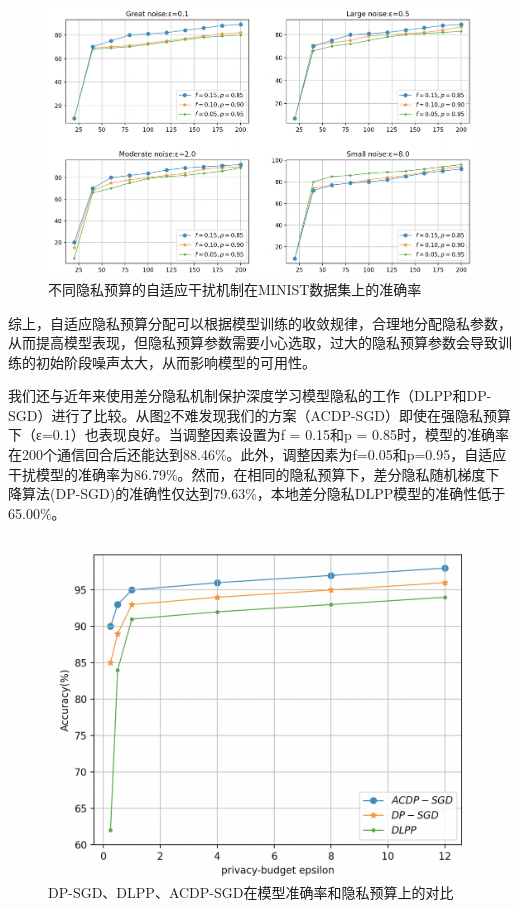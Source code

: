 \begin{figure}[!hbt]
\centering
  	\includegraphics[scale=0.4]{fig2/C5/自适应干扰实验}%
	\caption{不同隐私预算的自适应干扰机制在MINIST数据集上的准确率}
  	\label{fig:不同隐私预算的自适应干扰机制在MINIST数据集上的准确率} 
\end{figure}

综上，自适应隐私预算分配可以根据模型训练的收敛规律，合理地分配隐私参数，从而提高模型表现，但隐私预算参数需要小心选取，过大的隐私预算参数会导致训练的初始阶段噪声太大，从而影响模型的可用性。

我们还与近年来使用差分隐私机制保护深度学习模型隐私的工作（DLPP和DP-SGD）进行了比较。从图\ref{fig:DP-SGD、DLPP、ACDP-SGD在模型准确率和隐私预算上的对比}不难发现我们的方案（ACDP-SGD）即使在强隐私预算下（ε=0.1）也表现良好。当调整因素设置为f = 0.15和p = 0.85时，模型的准确率在200个通信回合后还能达到88.46$\%$。此外，调整因素为f=0.05和p=0.95，自适应干扰模型的准确率为86.79$\%$。然而，在相同的隐私预算下，差分隐私随机梯度下降算法(DP-SGD)的准确性仅达到79.63$\%$，本地差分隐私DLPP模型的准确性低于65.00$\%$。

\begin{figure}[!hbt]
\centering
  	\includegraphics[scale=0.4]{fig2/C5/自适应干扰实验对比}%
	\caption{DP-SGD、DLPP、ACDP-SGD在模型准确率和隐私预算上的对比}
  	\label{fig:DP-SGD、DLPP、ACDP-SGD在模型准确率和隐私预算上的对比} 
\end{figure}


